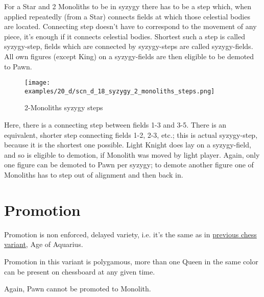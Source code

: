 For a Star and 2 Monoliths to be in syzygy there has to be a step which, when applied repeatedly (from a Star)
connects fields at which those celestial bodies are located. Connecting step doesn't have to correspond to the
movement of any piece, it's enough if it connects celestial bodies. Shortest such a step is called syzygy-step,
fields which are connected by syzygy-steps are called syzygy-fields. All own figures (except King) on a
syzygy-fields are then eligible to be demoted to Pawn.

\clearpage %

\noindent
\begin{figure}[!h]
\texttt{[image: examples/20\_d/scn\_d\_18\_syzygy\_2\_monoliths\_steps.png]}
\caption{2-Monoliths syzygy steps}
\label{fig:scn_d_18_syzygy_2_monoliths_steps}
\end{figure}

Here, there is a connecting step between fields 1-3 and 3-5. There is an equivalent, shorter step connecting fields
1-2, 2-3, etc.; this is actual syzygy-step, because it is the shortest one possible. Light Knight does lay on a
syzygy-field, and so is eligible to demotion, if Monolith was moved by light player. Again, only one figure can be
demoted to Pawn per syzygy; to demote another figure one of Monoliths has to step out of alignment and then back in.

\clearpage %

\section*{Promotion}

Promotion is non enforced, delayed variety, i.e. it's the same as in
\hyperref[sec:Age of Aquarius/Promotion]{previous chess variant}, Age of Aquarius.

Promotion in this variant is polygamous, more than one Queen in the same color
can be present on chessboard at any given time.

Again, Pawn cannot be promoted to Monolith.

\clearpage %

